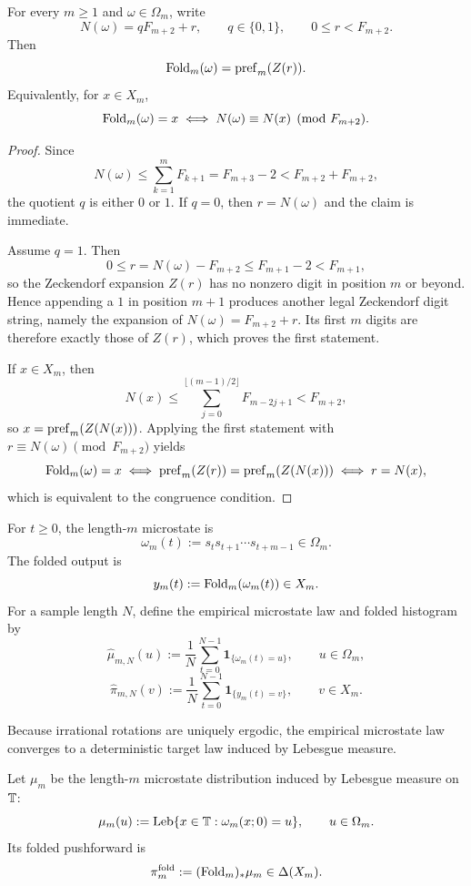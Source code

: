 \begin{proposition}\label{prop:fold-residue-characterization}
For every \(m\ge 1\) and \(\omega\in\Omega_m\), write
\[
N(\omega)=qF_{m+2}+r,
\qquad q\in\{0,1\},
\qquad 0\le r<F_{m+2}.
\]
Then
\[
\mathrm{Fold}_m(\omega)=\mathrm{pref}_m(Z(r)).
\]
Equivalently, for \(x\in X_m\),
\[
\mathrm{Fold}_m(\omega)=x
\iff
N(\omega)\equiv N(x)\pmod{F_{m+2}}.
\]
\end{proposition}

\begin{proof}
Since
\[
N(\omega)\le \sum_{k=1}^m F_{k+1}=F_{m+3}-2<F_{m+2}+F_{m+2},
\]
the quotient \(q\) is either \(0\) or \(1\). If \(q=0\), then \(r=N(\omega)\)
and the claim is immediate.

Assume \(q=1\). Then
\[
0\le r=N(\omega)-F_{m+2}\le F_{m+1}-2<F_{m+1},
\]
so the Zeckendorf expansion \(Z(r)\) has no nonzero digit in position \(m\) or
beyond. Hence appending a \(1\) in position \(m+1\) produces another legal
Zeckendorf digit string, namely the expansion of \(N(\omega)=F_{m+2}+r\). Its
first \(m\) digits are therefore exactly those of \(Z(r)\), which proves the
first statement.

If \(x\in X_m\), then
\[
N(x)\le \sum_{j=0}^{\lfloor (m-1)/2\rfloor}F_{m-2j+1}<F_{m+2},
\]
so \(x=\mathrm{pref}_m(Z(N(x)))\). Applying the first statement with
\(r\equiv N(\omega)\pmod{F_{m+2}}\) yields
\[
\mathrm{Fold}_m(\omega)=x
\iff
\mathrm{pref}_m(Z(r))=\mathrm{pref}_m(Z(N(x)))
\iff
r=N(x),
\]
which is equivalent to the congruence condition.
\end{proof}

\begin{definition}
For $t\ge 0$, the length-$m$ microstate is
\[
\omega_m(t):=s_t s_{t+1}\cdots s_{t+m-1}\in\Omega_m.
\]
The folded output is
\[
y_m(t):=\mathrm{Fold}_m(\omega_m(t))\in X_m.
\]
For a sample length $N$, define the empirical microstate law and folded
histogram by
\[
\hat\mu_{m,N}(u):=\frac{1}{N}\sum_{t=0}^{N-1}\mathbf{1}_{\{\omega_m(t)=u\}},
\qquad u\in\Omega_m,
\]
\[
\hat\pi_{m,N}(v):=\frac{1}{N}\sum_{t=0}^{N-1}\mathbf{1}_{\{y_m(t)=v\}},
\qquad v\in X_m.
\]
\end{definition}

Because irrational rotations are uniquely ergodic, the empirical microstate
law converges to a deterministic target law induced by Lebesgue measure.

\begin{definition}
Let $\mu_m$ be the length-$m$ microstate distribution induced by Lebesgue
measure on $\mathbb{T}$:
\[
\mu_m(u):=\mathrm{Leb}\{x\in\mathbb{T}:\omega_m(x;0)=u\},\qquad u\in\Omega_m.
\]
Its folded pushforward is
\[
\pi_m^{\mathrm{fold}}:=(\mathrm{Fold}_m)_*\mu_m\in\Delta(X_m).
\]
\end{definition}

